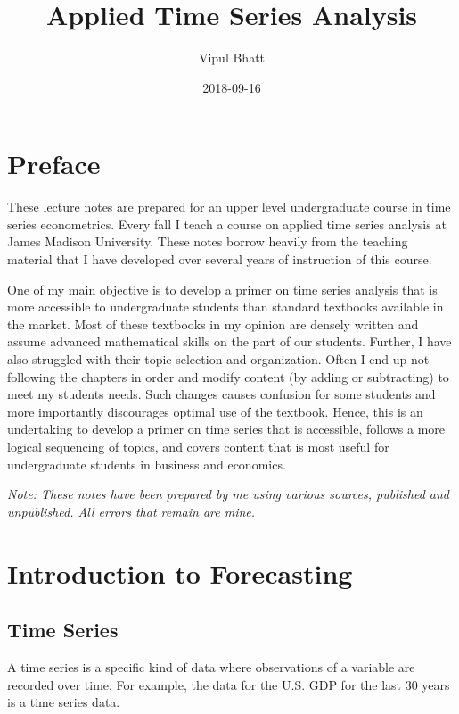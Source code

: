 \documentclass[]{book}
\title{Applied Time Series Analysis}
\author{Vipul Bhatt}
\date{2018-09-16}
\theoremstyle{definition}
\theoremstyle{definition}
\theoremstyle{definition}
\theoremstyle{remark}
\begin{document}
\maketitle

{
\setcounter{tocdepth}{1}
\tableofcontents
}
\hypertarget{preface}{%
\chapter*{Preface}\label{preface}}

These lecture notes are prepared for an upper level undergraduate course
in time series econometrics. Every fall I teach a course on applied time
series analysis at James Madison University. These notes borrow heavily
from the teaching material that I have developed over several years of
instruction of this course.

One of my main objective is to develop a primer on time series analysis
that is more accessible to undergraduate students than standard
textbooks available in the market. Most of these textbooks in my opinion
are densely written and assume advanced mathematical skills on the part
of our students. Further, I have also struggled with their topic
selection and organization. Often I end up not following the chapters in
order and modify content (by adding or subtracting) to meet my students
needs. Such changes causes confusion for some students and more
importantly discourages optimal use of the textbook. Hence, this is an
undertaking to develop a primer on time series that is accessible,
follows a more logical sequencing of topics, and covers content that is
most useful for undergraduate students in business and economics.

\emph{Note: These notes have been prepared by me using various sources,
published and unpublished. All errors that remain are mine.}

\hypertarget{intro}{%
\chapter{Introduction to Forecasting}\label{intro}}

\hypertarget{time-series}{%
\section{Time Series}\label{time-series}}

A time series is a specific kind of data where observations of a
variable are recorded over time. For example, the data for the U.S. GDP
for the last 30 years is a time series data.
\end{document}
